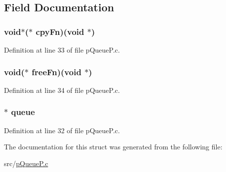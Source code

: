 \subsection{Field Documentation}
\hypertarget{structp_queue_c_d_t_abce72dff83b4c0563783ac39950547ac}{
\subsubsection[{cpyFn}]{\setlength{\rightskip}{0pt plus 5cm}void$\ast$($\ast$ {\bf cpyFn})(void $\ast$)}}
\label{structp_queue_c_d_t_abce72dff83b4c0563783ac39950547ac}


Definition at line 33 of file pQueueP.c.

\hypertarget{structp_queue_c_d_t_a1ea7dba004336f82292919dfead1aceb}{
\subsubsection[{freeFn}]{\setlength{\rightskip}{0pt plus 5cm}void($\ast$ {\bf freeFn})(void $\ast$)}}
\label{structp_queue_c_d_t_a1ea7dba004336f82292919dfead1aceb}


Definition at line 34 of file pQueueP.c.

\hypertarget{structp_queue_c_d_t_abd678f8ea5d396a97fd1938b4df23841}{
\subsubsection[{queue}]{$\ast$ {\bf queue}}}
\label{structp_queue_c_d_t_abd678f8ea5d396a97fd1938b4df23841}


Definition at line 32 of file pQueueP.c.



The documentation for this struct was generated from the following file:\begin{DoxyCompactItemize}
\item 
src/\hyperlink{p_queue_p_8c}{pQueueP.c}\end{DoxyCompactItemize}
